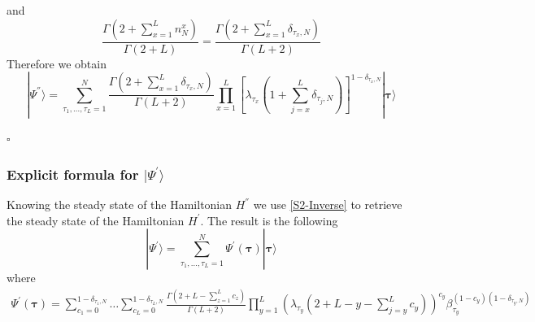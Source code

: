 \documentclass[10pt]{article}
\numberwithin{equation}{section}
\numberwithin{equation}{subsection}
\newcommand{\com}[1]{{ (* {\color{red}\small #1}*)}}
\begin{document}
and 
\begin{equation}
	\frac{\Gamma(2+\sum_{x=1}^{L}n_{N}^{x})}{\Gamma(2+L)}=\frac{\Gamma\left(2+\sum_{x=1}^{L}\delta_{\tau_{x},N}\right)}{\Gamma\left(L+2\right)}
\end{equation}
Therefore we obtain
\begin{equation}
|\Psi^{''}\rangle=\sum_{\tau_{1},\ldots,\tau_{L}=1}^{N}\frac{\Gamma\left(2+\sum_{x=1}^{L}\delta_{\tau_{x},N}\right)}{\Gamma\left(L+2\right)}\prod_{x=1}^{L}\left[\lambda_{\tau_{x}}\left(1+\sum_{j=x}^{L}\delta_{\tau_{j},N}\right)\right]^{1-\delta_{\tau_{x},N}}|\mathbf{\bm{\tau}}\rangle
\end{equation}
\begin{flushright}
$\square$
\end{flushright}
\subsubsection{Explicit formula for $|\Psi^{'}\rangle$}\label{subsectionSSdual}
Knowing the steady state  of the Hamiltonian $H^{''}$ we use \eqref{S2-Inverse} to retrieve the steady state of the Hamiltonian $H^{'}$. The result is the following 
\begin{equation}\label{ABS-vect}
    |\Psi^{'}\rangle =\sum_{\tau_{1},\ldots,\tau_{L}=1}^{N}\Psi^{'}(\bm{\tau})|\bm{\tau}\rangle 
\end{equation}
where  
\begin{equation}\label{ABS}
		\begin{split}
			\Psi^{'}(\bm{\tau})=\sum_{c_{1}=0}^{1-\delta_{\tau_{1},N}}\ldots\sum_{c_{L}=0}^{1-\delta_{\tau_{L},N}}\frac{\Gamma(2+L-\sum_{z=1}^{L}c_{z})}{\Gamma(L+2)}\prod_{y=1}^{L}\left(\lambda_{\tau_{y}}\left(2+L-y-\sum_{j=y}^{L}c_{y}\right)\right)^{c_{y}}\beta_{\tau_{y}}^{(1-c_{y})(1-\delta_{\tau_{y},N})}
		\end{split}
	\end{equation} 
\end{document}
